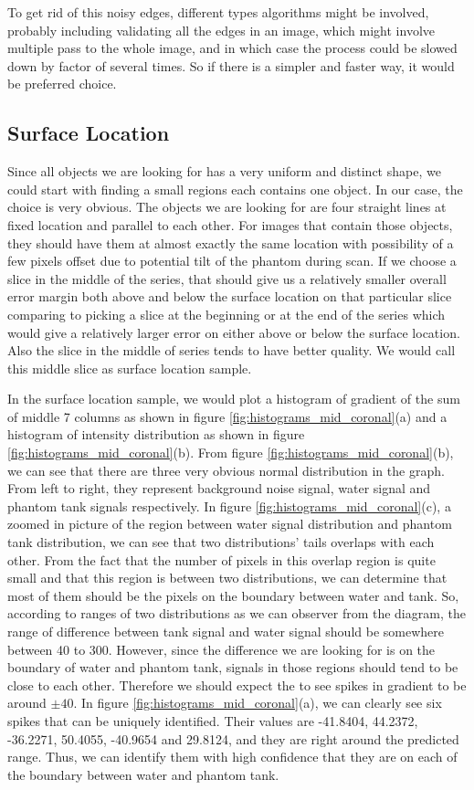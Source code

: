 To get rid of this noisy edges, different types algorithms might be involved, probably including validating
all the edges in an image,
which might involve multiple pass to the whole image, and in which case the process
could be slowed down by factor of several times. So if there is a simpler and faster way, it would be preferred
choice.

\subsection{Surface Location}

Since all objects we are looking for has a very uniform and distinct shape, we could start with finding a small 
regions each contains one object. In our case, the choice is very obvious. The objects we are looking for are
four straight lines at fixed location and parallel to each other. For images that contain those objects, they
should have them at almost exactly the same location with possibility of a few pixels offset due to potential
tilt of the phantom during scan. If we choose a slice in the middle of the series, that should give us a
relatively smaller overall error margin both above and below the surface location on that particular slice
comparing to picking a slice at the beginning or at the end of the series which would give a relatively larger 
error on either above or below the surface location. Also the slice in the middle of series tends to have better 
quality. We would call this middle slice as surface location sample.

In the surface location sample, we would plot a histogram of gradient of the sum of middle 7 columns as shown
in figure \ref{fig:histograms_mid_coronal}(a) and a histogram of intensity distribution as shown in
figure \ref{fig:histograms_mid_coronal}(b). From figure \ref{fig:histograms_mid_coronal}(b), we can see that there
are three very obvious normal distribution in the graph. 
From left to right, they represent background noise signal, water signal and phantom tank signals respectively.
In figure \ref{fig:histograms_mid_coronal}(c), a zoomed in picture of the region between water signal distribution
and phantom tank distribution, we can see that two distributions' tails overlaps with each other. From the fact 
that the number of pixels in this overlap region is quite small and that this region is between two 
distributions, we can determine that most of them should be the pixels on the boundary between water and tank.
So, according to ranges of two distributions as we can observer from the diagram, the range of difference
between tank signal and water signal should be somewhere between 40 to 300. However, since the difference we are
looking for is on the boundary of water and phantom tank, signals in those regions should tend to be close 
to each other. Therefore we should expect the to see spikes in gradient to be around $\pm40$. In figure
\ref{fig:histograms_mid_coronal}(a), we can clearly see six spikes that can be uniquely identified.
Their values are -41.8404, 44.2372, -36.2271, 50.4055, -40.9654 and 29.8124, and they are right around the 
predicted range. Thus, we can identify them with high confidence that they are on each of the boundary between
water and phantom tank.

